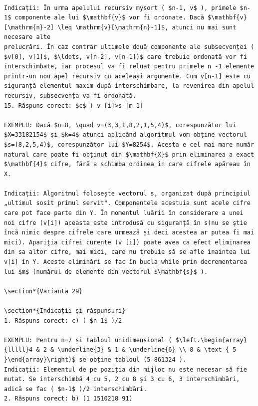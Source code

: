 \documentclass[10pt]{article}
\begin{document}
\begin{verbatim}

Indicații: În urma apelului recursiv mysort ( $n-1, v$ ), primele $n-1$ componente ale lui $\mathbf{v}$ vor fi ordonate. Dacă $\mathbf{v}[\mathrm{n}-2] \leq \mathrm{v}[\mathrm{n}-1]$, atunci nu mai sunt necesare alte
prelucrări. În caz contrar ultimele două componente ale subsecvenței ( $v[0], v[1]$, $\ldots, v[n-2], v[n-1])$ care trebuie ordonată vor fi interschimbate, iar procesul va fi reluat pentru primele n -1 elemente printr-un nou apel recursiv cu aceleași argumente. Cum v[n-1] este cu siguranță elementul maxim după interschimbare, la revenirea din apelul recursiv, subsecvența va fi ordonată.
15. Răspuns corect: $c$ ) v [i]>s [m-1]

EXEMPLU: Dacă $n=8, \quad v=(3,3,1,8,2,1,5,4)$, corespunzător lui $X=33182154$ și $k=4$ atunci aplicând algoritmul vom obține vectorul $s=(8,2,5,4)$, corespunzător lui $Y=8254$. Acesta e cel mai mare număr natural care poate fi obținut din $\mathbf{X}$ prin eliminarea a exact $\mathbf{4}$ cifre, fără a schimba ordinea în care cifrele apăreau în X.

Indicații: Algoritmul folosește vectorul s, organizat după principiul „ultimul sosit primul servit". Componentele acestuia sunt acele cifre care pot face parte din Y. În momentul luării în considerare a unei noi cifre (v[i]) aceasta este introdusă cu siguranță în s(nu se știe încă nimic despre cifrele care urmează și deci acestea ar putea fi mai mici). Apariția cifrei curente (v [i]) poate avea ca efect eliminarea din sa altor cifre, mai mici, care nu trebuie să se afle înaintea lui v[i] în Y. Aceste eliminări se fac în bucla while prin decrementarea lui $m$ (numărul de elemente din vectorul $\mathbf{s}$ ).

\section*{Varianta 29}

\section*{Indicații și răspunsuri}
1. Răspuns corect: c) ( $n-1$ )/2

EXEMPLU: Pentru n=7 și tabloul unidimensional ( $\left.\begin{array}{lllll}4 & 2 & \underline{3} & 1 & \underline{6} \\ 8 & \text { 5 }\end{array}\right)$ se obține tabloul (5 861324 ).
Indicații: Elementul de pe poziția din mijloc nu este necesar să fie mutat. Se interschimbă 4 cu 5, 2 cu 8 și 3 cu 6, 3 interschimbări, adică se fac ( $n-1$ )/2 interschimbări.
2. Răspuns corect: b) (1 1510218 91)


\end{verbatim}
\end{document}
